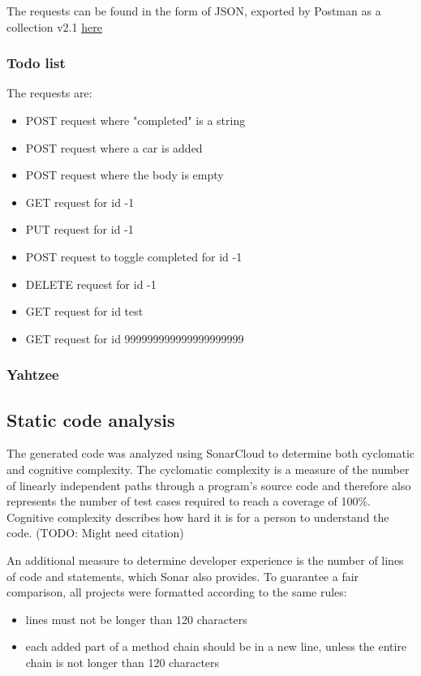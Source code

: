 \documentclass[a4paper]{article}
\begin{document}
The requests can be found in the form of JSON, exported by Postman as a
collection v2.1
\hyperlink{https://github.com/lerchl/curryful-bachelor-thesis-postman-requests}{here}
\newline

\subsubsection{Todo list}
\noindent The requests are:
\begin{itemize}
	\item POST request where "completed" is a string
	\item POST request where a car is added
	\item POST request where the body is empty
	\item GET request for id -1
	\item PUT request for id -1
	\item POST request to toggle completed for id -1
	\item DELETE request for id -1
	\item GET request for id test
	\item GET request for id 999999999999999999999
\end{itemize}

\subsubsection{Yahtzee}

\subsection{Static code analysis}
The generated code was analyzed using SonarCloud to determine both cyclomatic
and cognitive complexity. The cyclomatic complexity is a measure of the number
of linearly independent paths through a program's source code and therefore also
represents the number of test cases required to reach a coverage of 100\%.
Cognitive complexity describes how hard it is for a person to understand the
code. (TODO: Might need citation) \newline

\noindent An additional measure to determine developer experience is the number
of lines of code and statements, which Sonar also provides. To guarantee a fair
comparison, all projects were formatted according to the same rules:

\begin{itemize}
	\item lines must not be longer than 120 characters
	\item each added part of a method chain should be in a new line, unless
	      the entire chain is not longer than 120 characters
\end{itemize}
\end{document}
